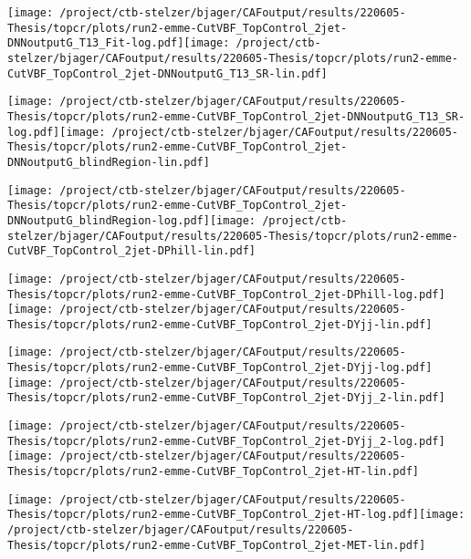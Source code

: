 \documentclass{article}
\begin{document}
\texttt{[image: /project/ctb-stelzer/bjager/CAFoutput/results/220605-Thesis/topcr/plots/run2-emme-CutVBF\_TopControl\_2jet-DNNoutputG\_T13\_Fit-log.pdf]}\texttt{[image: /project/ctb-stelzer/bjager/CAFoutput/results/220605-Thesis/topcr/plots/run2-emme-CutVBF\_TopControl\_2jet-DNNoutputG\_T13\_SR-lin.pdf]}

\texttt{[image: /project/ctb-stelzer/bjager/CAFoutput/results/220605-Thesis/topcr/plots/run2-emme-CutVBF\_TopControl\_2jet-DNNoutputG\_T13\_SR-log.pdf]}\texttt{[image: /project/ctb-stelzer/bjager/CAFoutput/results/220605-Thesis/topcr/plots/run2-emme-CutVBF\_TopControl\_2jet-DNNoutputG\_blindRegion-lin.pdf]}

\texttt{[image: /project/ctb-stelzer/bjager/CAFoutput/results/220605-Thesis/topcr/plots/run2-emme-CutVBF\_TopControl\_2jet-DNNoutputG\_blindRegion-log.pdf]}\texttt{[image: /project/ctb-stelzer/bjager/CAFoutput/results/220605-Thesis/topcr/plots/run2-emme-CutVBF\_TopControl\_2jet-DPhill-lin.pdf]}

\texttt{[image: /project/ctb-stelzer/bjager/CAFoutput/results/220605-Thesis/topcr/plots/run2-emme-CutVBF\_TopControl\_2jet-DPhill-log.pdf]}\texttt{[image: /project/ctb-stelzer/bjager/CAFoutput/results/220605-Thesis/topcr/plots/run2-emme-CutVBF\_TopControl\_2jet-DYjj-lin.pdf]}

\texttt{[image: /project/ctb-stelzer/bjager/CAFoutput/results/220605-Thesis/topcr/plots/run2-emme-CutVBF\_TopControl\_2jet-DYjj-log.pdf]}\texttt{[image: /project/ctb-stelzer/bjager/CAFoutput/results/220605-Thesis/topcr/plots/run2-emme-CutVBF\_TopControl\_2jet-DYjj\_2-lin.pdf]}

\texttt{[image: /project/ctb-stelzer/bjager/CAFoutput/results/220605-Thesis/topcr/plots/run2-emme-CutVBF\_TopControl\_2jet-DYjj\_2-log.pdf]}\texttt{[image: /project/ctb-stelzer/bjager/CAFoutput/results/220605-Thesis/topcr/plots/run2-emme-CutVBF\_TopControl\_2jet-HT-lin.pdf]}

\texttt{[image: /project/ctb-stelzer/bjager/CAFoutput/results/220605-Thesis/topcr/plots/run2-emme-CutVBF\_TopControl\_2jet-HT-log.pdf]}\texttt{[image: /project/ctb-stelzer/bjager/CAFoutput/results/220605-Thesis/topcr/plots/run2-emme-CutVBF\_TopControl\_2jet-MET-lin.pdf]}
\end{document}
